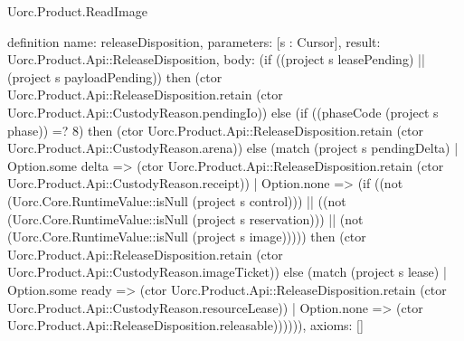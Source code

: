 \begin{lexlean}{Uorc.Product.ReadImage}
\begin{semanticmodule}
definition{
  name: releaseDisposition,
  parameters: [s : Cursor],
  result: Uorc.Product.Api::ReleaseDisposition,
  body: (if ((project s leasePending) || (project s payloadPending)) then (ctor Uorc.Product.Api::ReleaseDisposition.retain (ctor Uorc.Product.Api::CustodyReason.pendingIo)) else (if ((phaseCode (project s phase)) =? 8) then (ctor Uorc.Product.Api::ReleaseDisposition.retain (ctor Uorc.Product.Api::CustodyReason.arena)) else (match (project s pendingDelta)
    | Option.some delta => (ctor Uorc.Product.Api::ReleaseDisposition.retain (ctor Uorc.Product.Api::CustodyReason.receipt))
    | Option.none => (if ((not (Uorc.Core.RuntimeValue::isNull (project s control))) || ((not (Uorc.Core.RuntimeValue::isNull (project s reservation))) || (not (Uorc.Core.RuntimeValue::isNull (project s image))))) then (ctor Uorc.Product.Api::ReleaseDisposition.retain (ctor Uorc.Product.Api::CustodyReason.imageTicket)) else (match (project s lease)
      | Option.some ready => (ctor Uorc.Product.Api::ReleaseDisposition.retain (ctor Uorc.Product.Api::CustodyReason.resourceLease))
      | Option.none => (ctor Uorc.Product.Api::ReleaseDisposition.releasable)))))),
  axioms: []
}
\end{semanticmodule}
\end{lexlean}
